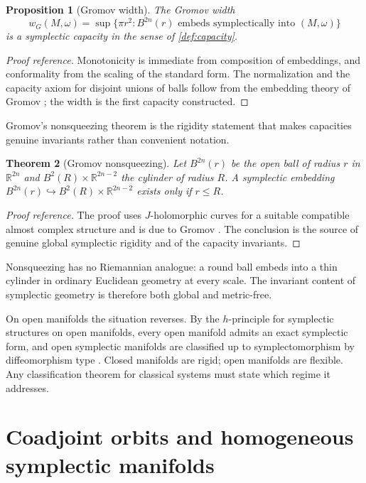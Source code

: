 \documentclass[11pt,letterpaper]{article}
\newtheorem{theorem}{Theorem}[section]
\newtheorem{proposition}[theorem]{Proposition}
\theoremstyle{definition}
\theoremstyle{remark}
\begin{document}
\begin{proposition}[Gromov width]
\label{prop:gromov-width}
The Gromov width
\[
w_G(M, \omega) = \sup \{ \pi r^{2} : B^{2n}(r) \text{ embeds symplectically into } (M, \omega) \}
\]
is a symplectic capacity in the sense of \cref{def:capacity}.
\end{proposition}

\begin{proof}[Proof reference]
Monotonicity is immediate from composition of embeddings, and conformality from the scaling of the standard form. The normalization and the capacity axiom for disjoint unions of balls follow from the embedding theory of Gromov \cite{gromov-hol}; the width is the first capacity constructed.
\end{proof}

Gromov's nonsqueezing theorem is the rigidity statement that makes capacities genuine invariants rather than convenient notation.

\begin{theorem}[Gromov nonsqueezing]
\label{thm:nonsqueezing}
Let $B^{2n}(r)$ be the open ball of radius $r$ in $\mathbb{R}^{2n}$ and $B^{2}(R) \times \mathbb{R}^{2n-2}$ the cylinder of radius $R$. A symplectic embedding $B^{2n}(r) \hookrightarrow B^{2}(R) \times \mathbb{R}^{2n-2}$ exists only if $r \leq R$.
\end{theorem}

\begin{proof}[Proof reference]
The proof uses $J$-holomorphic curves for a suitable compatible almost complex structure and is due to Gromov \cite{gromov-hol}. The conclusion is the source of genuine global symplectic rigidity and of the capacity invariants.
\end{proof}

Nonsqueezing has no Riemannian analogue: a round ball embeds into a thin cylinder in ordinary Euclidean geometry at every scale. The invariant content of symplectic geometry is therefore both global and metric-free.

On open manifolds the situation reverses. By the $h$-principle for symplectic structures on open manifolds, every open manifold admits an exact symplectic form, and open symplectic manifolds are classified up to symplectomorphism by diffeomorphism type \cite{gromov-pdr}. Closed manifolds are rigid; open manifolds are flexible. Any classification theorem for classical systems must state which regime it addresses.

\section{Coadjoint orbits and homogeneous symplectic manifolds}
\end{document}
